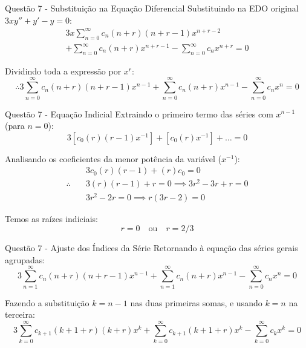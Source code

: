 \documentclass[8pt,aspectratio = 169]{beamer}
\begin{document}
\begin{frame}{Questão 7 - Substituição na Equação Diferencial}
    Substituindo na EDO original $3xy'' + y' - y = 0$:
    \begin{multline*}
        3x \sum_{n=0}^{\infty} c_n(n+r)(n+r-1)x^{n+r-2} \\ 
        + \sum_{n=0}^{\infty} c_n(n+r)x^{n+r-1} - \sum_{n=0}^{\infty} c_n x^{n+r} = 0 
    \end{multline*}
    
    Dividindo toda a expressão por $x^r$:
    \begin{equation*}
        \therefore 3 \sum_{n=0}^{\infty} c_n(n+r)(n+r-1)x^{n-1} + \sum_{n=0}^{\infty} c_n(n+r)x^{n-1} - \sum_{n=0}^{\infty} c_n x^n = 0
    \end{equation*}
\end{frame}

\begin{frame}{Questão 7 - Equação Indicial}
    Extraindo o primeiro termo das séries com $x^{n-1}$ (para $n=0$):
    \begin{equation*}
        3\left[c_0(r)(r-1)x^{-1} \right] + \left[c_0(r)x^{-1} \right] + \dots = 0
    \end{equation*}
    
    Analisando os coeficientes da menor potência da variável ($x^{-1}$):
    \begin{align*}
        &3 c_0(r)(r-1) + (r)c_0 = 0 \\
        \therefore \quad &3(r)(r-1) + r = 0 \implies 3r^2 - 3r + r = 0 \\
        &3r^2 - 2r = 0 \implies r(3r - 2) = 0
    \end{align*}
    
    Temos as raízes indiciais:
    \begin{equation*}
        r = 0 \quad \text{ou} \quad r = 2/3
    \end{equation*}
\end{frame}

\begin{frame}{Questão 7 - Ajuste dos Índices da Série}
    Retornando à equação das séries gerais agrupadas:
    \begin{equation*}
        3 \sum_{n=1}^{\infty} c_n(n+r)(n+r-1)x^{n-1} + \sum_{n=1}^{\infty} c_n(n+r)x^{n-1} - \sum_{n=0}^{\infty} c_n x^n = 0
    \end{equation*}
    
    Fazendo a substituição $k = n-1$ nas duas primeiras somas, e usando $k=n$ na terceira:
    \begin{equation*}
        3 \sum_{k=0}^{\infty} c_{k+1}(k+1+r)(k+r)x^k + \sum_{k=0}^{\infty} c_{k+1}(k+1+r)x^k - \sum_{k=0}^{\infty} c_k x^k = 0
    \end{equation*}
\end{frame}
\end{document}
